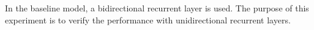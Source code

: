 
In the baseline model, a bidirectional recurrent layer is
used. The purpose of this experiment is to verify the
performance with unidirectional recurrent layers.

